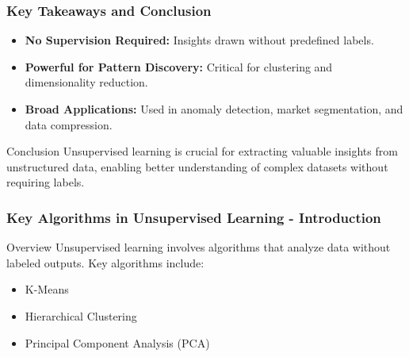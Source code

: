 \documentclass{beamer}
\begin{document}
\begin{frame}[fragile]
    \frametitle{Key Takeaways and Conclusion}
    \begin{itemize}
        \item \textbf{No Supervision Required:} Insights drawn without predefined labels.
        \item \textbf{Powerful for Pattern Discovery:} Critical for clustering and dimensionality reduction.
        \item \textbf{Broad Applications:} Used in anomaly detection, market segmentation, and data compression.
    \end{itemize}
    
    \begin{block}{Conclusion}
        Unsupervised learning is crucial for extracting valuable insights from unstructured data, enabling better understanding of complex datasets without requiring labels.
    \end{block}
\end{frame}

\begin{frame}[fragile]
    \frametitle{Key Algorithms in Unsupervised Learning - Introduction}
    \begin{block}{Overview}
        Unsupervised learning involves algorithms that analyze data without labeled outputs. Key algorithms include:
        \begin{itemize}
            \item K-Means
            \item Hierarchical Clustering
            \item Principal Component Analysis (PCA)
        \end{itemize}
    \end{block}
\end{frame}
\end{document}
